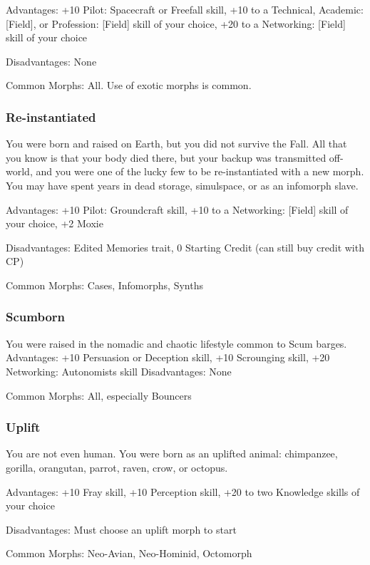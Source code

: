 Advantages: +10 Pilot: Spacecraft or Freefall skill, +10 to a Technical, Academic: [Field], or Profession: [Field] skill of your choice, +20 to a Networking: [Field] skill of your choice

Disadvantages: None

Common Morphs: All. Use of exotic morphs is common.

\subsubsection{Re-instantiated}
\label{sec:re-instantiated}

You were born and raised on Earth, but you did not survive the Fall. All that you know is that your body died there, but your backup was transmitted off-world, and you were one of the lucky few to be re-instantiated with a new morph. You may have spent years in dead storage, simulspace, or as an infomorph slave.

Advantages: +10 Pilot: Groundcraft skill, +10 to a Networking: [Field] skill of your choice, +2 Moxie

Disadvantages: Edited Memories trait, 0 Starting Credit (can still buy credit with CP)

Common Morphs: Cases, Infomorphs, Synths

\subsubsection{Scumborn}
\label{sec:scumborn}

You were raised in the nomadic and chaotic lifestyle common to Scum barges. Advantages: +10 Persuasion or Deception skill, +10 Scrounging skill, +20 Networking: Autonomists skill Disadvantages: None

Common Morphs: All, especially Bouncers

\subsubsection{Uplift}
\label{sec:uplift}

You are not even human. You were born as an uplifted animal: chimpanzee, gorilla, orangutan, parrot, raven, crow, or octopus.

Advantages: +10 Fray skill, +10 Perception skill, +20 to two Knowledge skills of your choice

Disadvantages: Must choose an uplift morph to start

Common Morphs: Neo-Avian, Neo-Hominid, Octomorph


